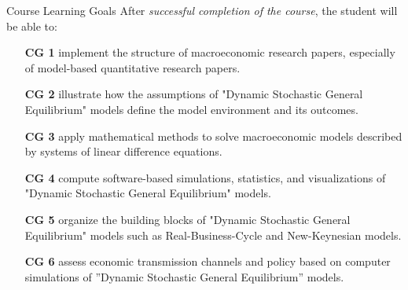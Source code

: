 \documentclass[10pt,c,aspectratio=1610,handout]{beamer}
\begin{document}
\begin{frame}{Course Learning Goals}%
  After \emph{successful completion of the course}, the student will be able to:%
  \vspace{0.1in}%
  \pause%
  \begin{itemize}%
    \item[\textbf{CG 1}] implement the structure of macroeconomic research papers, especially of model-based quantitative research papers.%
    \pause%
    \item[\textbf{CG 2}] illustrate how the assumptions of "Dynamic Stochastic General Equilibrium" models define the model environment and its outcomes.%
    \pause%
    \item[\textbf{CG 3}] apply mathematical methods to solve macroeconomic models described by systems of linear difference equations.%
    \pause%
    \item[\textbf{CG 4}] compute software-based simulations, statistics, and visualizations of "Dynamic Stochastic General Equilibrium" models.%
    \pause%
    \item[\textbf{CG 5}] organize the building blocks of "Dynamic Stochastic General Equilibrium" models such as Real-Business-Cycle and New-Keynesian models.%
    \pause%
    \item[\textbf{CG 6}] assess economic transmission channels and policy based on computer simulations of ''Dynamic Stochastic General Equilibrium'' models.%
  \end{itemize}%
\end{frame}%
\end{document}
